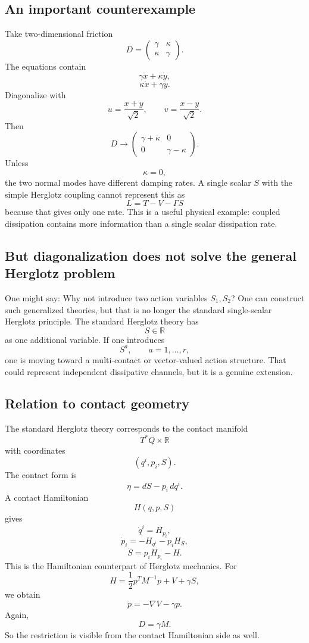 \subsection{An important counterexample}

Take two-dimensional friction
$$ D= \begin{pmatrix} \gamma&\kappa\\ \kappa&\gamma \end{pmatrix}. $$
The equations contain
$$ \gamma\dot x+\kappa\dot y, $$ $$ \kappa\dot x+\gamma\dot y. $$
Diagonalize with
$$ u=\frac{x+y}{\sqrt2}, \qquad v=\frac{x-y}{\sqrt2}. $$
Then
$$ D\rightarrow \begin{pmatrix} \gamma+\kappa&0\\ 0&\gamma-\kappa \end{pmatrix}. $$
Unless
$$ \kappa=0, $$
the two normal modes have different damping rates.
A single scalar \(S\) with the simple Herglotz coupling cannot represent this as
$$ L=T-V-\Gamma S $$
because that gives only one rate.
This is a useful physical example: coupled dissipation contains more information than a single scalar dissipation rate.

\subsection{But diagonalization does not solve the general Herglotz problem}

One might say:
Why not introduce two action variables \(S_1,S_2\)?
One can construct such generalized theories, but that is no longer the standard single-scalar Herglotz principle.
The standard Herglotz theory has
$$ \boxed{S\in\mathbb R} $$
as one additional variable.
If one introduces
$$ S^a,\qquad a=1,\ldots,r, $$
one is moving toward a multi-contact or vector-valued action structure.
That could represent independent dissipative channels, but it is a genuine extension.

\subsection{Relation to contact geometry}

The standard Herglotz theory corresponds to the contact manifold
$$ T^*Q\times\mathbb R $$
with coordinates
$$ (q^i,p_i,S). $$
The contact form is
$$ \eta=dS-p_i\,dq^i. $$
A contact Hamiltonian
$$ H(q,p,S) $$
gives
$$ \dot q^i=H_{p_i}, $$ $$ \dot p_i=-H_{q^i}-p_iH_S, $$ 
$$ \dot S=p_iH_{p_i}-H. $$
This is the Hamiltonian counterpart of Herglotz mechanics.
For
$$ H=\frac12p^TM^{-1}p+V+\gamma S, $$
we obtain
$$ \dot p=-\nabla V-\gamma p. $$
Again,
$$ D=\gamma M. $$
So the restriction is visible from the contact Hamiltonian side as well.

